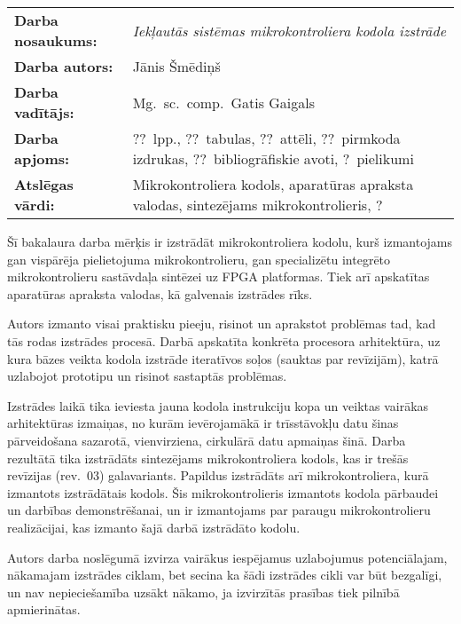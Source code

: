 
\abstitlestyle{\abstractname} %
\noindent%
\begin{tabularx}{\textwidth}{lX}
	\textbf{Darba nosaukums:} & 
		\textit{Iekļautās sistēmas mikrokontroliera kodola izstrāde}\\[1ex]
	\textbf{Darba autors:} & Jānis Šmēdiņš\\[1ex]
	\textbf{Darba vadītājs:} & Mg.~sc.~comp.~Gatis Gaigals\\[1ex]
	\textbf{Darba apjoms:} & ??~lpp., ??~tabulas, ??~attēli,
		??~pirmkoda izdrukas, ??~bibliogrāfiskie avoti, ?~pielikumi\\[1ex]
	\textbf{Atslēgas vārdi:} & Mikrokontroliera kodols, aparatūras apraksta valodas,
		sintezējams mikrokontrolieris, \todo{}?
\end{tabularx}

\vspace{1em}
Šī bakalaura darba mērķis ir izstrādāt mikrokontroliera
kodolu, kurš izmantojams gan vispārēja pielietojuma mikrokontrolieru,
gan specializētu integrēto mikrokontrolieru sastāvdaļa sintēzei uz FPGA
platformas. Tiek arī apskatītas aparatūras apraksta valodas,
kā galvenais izstrādes rīks.

Autors izmanto visai praktisku pieeju, risinot un aprakstot problēmas tad,
kad tās rodas izstrādes procesā. Darbā apskatīta konkrēta procesora
arhitektūra, uz kura bāzes veikta kodola izstrāde iteratīvos soļos
(sauktas par revīzijām), katrā
uzlabojot prototipu un risinot sastaptās problēmas.

Izstrādes laikā tika ieviesta jauna kodola instrukciju kopa un veiktas
vairākas arhitektūras izmaiņas, no kurām ievērojamākā ir trīsstāvokļu datu šinas
pārveidošana sazarotā, vienvirziena, cirkulārā datu apmaiņas šinā.
Darba rezultātā tika izstrādāts sintezējams mikrokontroliera kodols, kas ir
trešās revīzijas (rev.~03) galavariants. Papildus izstrādāts arī
mikrokontroliera, kurā izmantots izstrādātais kodols.
Šis mikrokontrolieris izmantots kodola pārbaudei un darbības demonstrēšanai,
un ir izmantojams par paraugu mikrokontrolieru realizācijai, kas izmanto
šajā darbā izstrādāto kodolu.

Autors darba noslēgumā izvirza vairākus iespējamus uzlabojumus potenciālajam,
nākamajam izstrādes ciklam, bet secina ka šādi izstrādes cikli var būt
bezgalīgi, un nav nepieciešamība uzsākt nākamo, ja izvirzītās prasības
tiek pilnībā apmierinātas.



